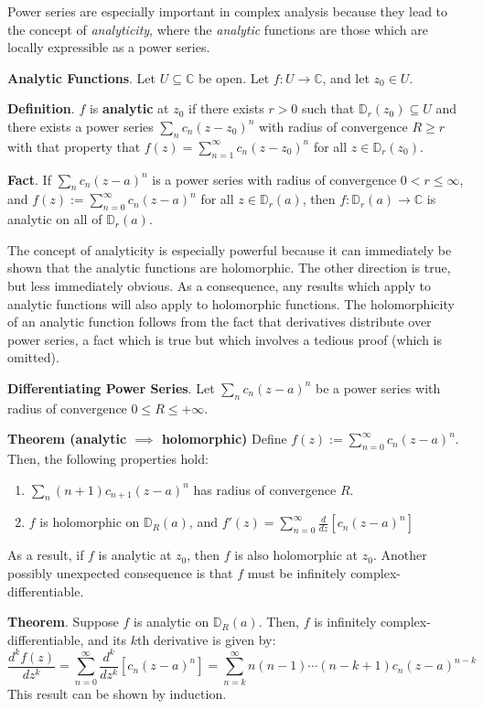 Power series are especially important in complex analysis because they lead to the concept of \textit{analyticity}, where the \textit{analytic} functions are those which are locally expressible as a power series.

\begin{framed}
    \textbf{Analytic Functions}. Let $U\subseteq\mathbb{C}$ be open. Let $f:U\to \mathbb{C}$, and let $z_0\in U$. 
    
    \textbf{Definition}. $f$ is \textbf{analytic} at $z_0$ if there exists $r>0$ such that $\mathbb{D}_r(z_0)\subseteq U$ and there exists a power series $\sum_n c_n (z-z_0)^n$ with radius of convergence $R\geq r$ with that property that $f(z) = \sum_{n=1}^\infty c_n(z-z_0)^n$ for all $z\in \mathbb{D}_r(z_0)$.

    \textbf{Fact}. If $\sum_n c_n(z-a)^n$ is a power series with radius of convergence $0<r\leq \infty$, and $f(z):= \sum_{n=0}^\infty c_n (z-a)^n$ for all $z\in \mathbb{D}_r(a)$, then $f:\mathbb{D}_r(a)\to \mathbb{C}$ is analytic on all of $\mathbb{D}_r(a)$.
\end{framed}

The concept of analyticity is especially powerful because it can immediately be shown that the analytic functions are holomorphic. The other direction is true, but less immediately obvious. As a consequence, any results which apply to analytic functions will also apply to holomorphic functions. The holomorphicity of an analytic function follows from the fact that derivatives distribute over power series, a fact which is true but which involves a tedious proof (which is omitted).

\begin{shaded}
    \textbf{Differentiating Power Series}. Let $\sum_n c_n(z-a)^n$ be a power series with radius of convergence $0\leq R \leq +\infty$.  
    
    \textbf{Theorem (analytic $\implies$ holomorphic)} Define $f(z):=\sum_{n=0}^\infty c_n(z-a)^n$. Then, the following properties hold: \vspace{-1.5em}\begin{enumerate}
        \item[(i)] $\sum_n (n+1)c_{n+1}(z-a)^{n}$ has radius of convergence $R$.
        \item[(ii)] $f$ is holomorphic on $\mathbb{D}_R(a)$, and $f'(z) = \sum_{n=0}^\infty \frac{d}{dz} \left[c_n (z-a)^n\right]$
    \end{enumerate}
    As a result, if $f$ is analytic at $z_0$, then $f$ is also holomorphic at $z_0$. Another possibly unexpected consequence is that $f$ must be infinitely complex-differentiable.

    \textbf{Theorem}. Suppose $f$ is analytic on $\mathbb{D}_R(a)$. Then, $f$ is infinitely complex-differentiable, and its $k$th derivative is given by: \[\frac{d^kf(z)}{dz^k} = \sum_{n=0}^\infty \frac{d^k}{dz^k} \left[c_n (z-a)^n\right] = \sum_{n=k}^\infty n (n-1)\cdots(n-k+1) c_n (z-a)^{n-k}\] This result can be shown by induction.
\end{shaded}


